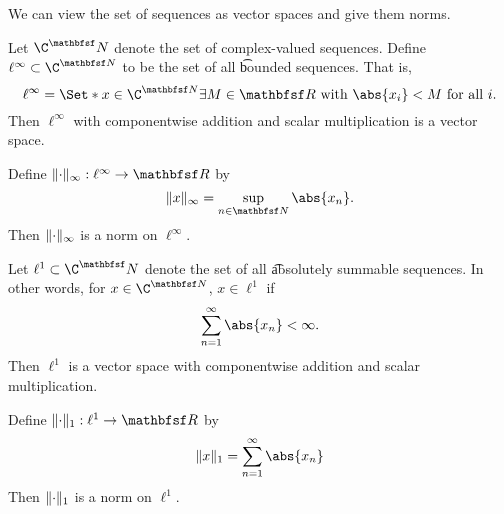
We can view the set of sequences as vector spaces and give them norms.


Let $\C^\N$ denote the set of complex-valued sequences.
Define $\ell^{\infty} \subset \C^{\N}$ to be the set of all \t{bounded sequences}.
That is,
  \[
\ell^{\infty} = \Set*{x \in \C^{\N}}{\exists M \in \R \text{ with } \abs{x_i} < M \text{ for all } i}.
  \]
Then $\ell^\infty$ with componentwise addition and scalar multiplication is a vector space.

\begin{exercise}
Define $\norm{\cdot}_{\infty}: \ell^{\infty} \to \R$ by
  \[
\norm{x}_{\infty} = \sup_{n \in \N} \abs{x_n}.
  \]
Then $\lVert\cdot\rVert_{\infty}$ is a norm on $\ell^\infty$.
\end{exercise}


Let $\ell^1 \subset \C^\N$ denote the set of all \t{absolutely summable sequences}. In other words, for $x \in \C^{\N}$, $x \in \ell^1$ if
  \[
\sum_{n = 1}^{\infty} \abs{x_n} < \infty.
  \]
Then $\ell^1$ is a vector space with componentwise addition and scalar multiplication.

\begin{exercise}
Define $\norm{\cdot}_{1}: \ell^{1} \to \R$ by
  \[
\norm{x}_{1} = \sum_{n = 1}^{\infty} \abs{x_n}
  \]
Then $\lVert\cdot\rVert_{1}$ is a norm on $\ell^1$.
\end{exercise}
